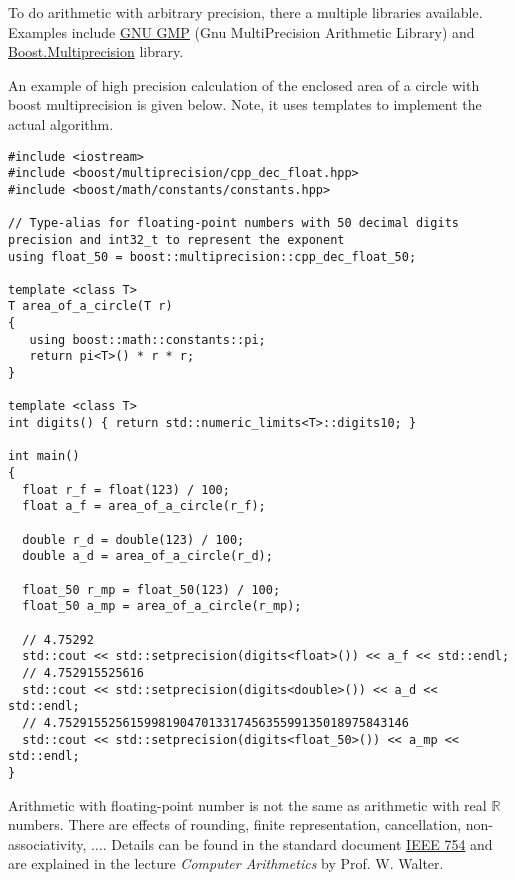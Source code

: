 \begin{rem}
  To do arithmetic with arbitrary precision, there a multiple libraries available. Examples include \href{https://gmplib.org/}{GNU GMP}
  (Gnu MultiPrecision Arithmetic Library) and \href{https://www.boost.org/doc/libs/1_71_0/libs/multiprecision/doc/html/index.html}{Boost.Multiprecision} library.

  An example of high precision calculation of the enclosed area of a circle with boost multiprecision is given below. Note, it uses templates to
  implement the actual algorithm.
\end{rem}
\begin{verbatim}
#include <iostream>
#include <boost/multiprecision/cpp_dec_float.hpp>
#include <boost/math/constants/constants.hpp>

// Type-alias for floating-point numbers with 50 decimal digits precision and int32_t to represent the exponent
using float_50 = boost::multiprecision::cpp_dec_float_50;

template <class T>
T area_of_a_circle(T r)
{
   using boost::math::constants::pi;
   return pi<T>() * r * r;
}

template <class T>
int digits() { return std::numeric_limits<T>::digits10; }

int main()
{
  float r_f = float(123) / 100;
  float a_f = area_of_a_circle(r_f);

  double r_d = double(123) / 100;
  double a_d = area_of_a_circle(r_d);

  float_50 r_mp = float_50(123) / 100;
  float_50 a_mp = area_of_a_circle(r_mp);

  // 4.75292
  std::cout << std::setprecision(digits<float>()) << a_f << std::endl;
  // 4.752915525616
  std::cout << std::setprecision(digits<double>()) << a_d << std::endl;
  // 4.7529155256159981904701331745635599135018975843146
  std::cout << std::setprecision(digits<float_50>()) << a_mp << std::endl;
}
\end{verbatim}


\begin{rem}
  Arithmetic with floating-point number is not the same as arithmetic with real $\mathbb{R}$ numbers. There are effects of rounding,
  finite representation, cancellation, non-associativity, $\ldots$. Details can be found in the standard document
  \href{https://standards.ieee.org/content/ieee-standards/en/standard/754-2019.html}{IEEE 754} and are explained in the lecture
  \emph{Computer Arithmetics} by Prof. W. Walter.
\end{rem}


